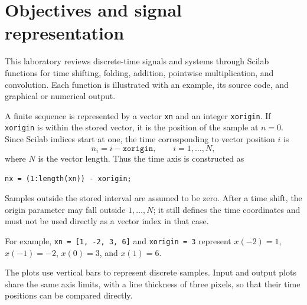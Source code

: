 \section{Objectives and signal representation}
This laboratory reviews discrete-time signals and systems through Scilab
functions for time shifting, folding, addition, pointwise multiplication,
and convolution. Each function is illustrated with an example, its source
code, and graphical or numerical output.

A finite sequence is represented by a vector \texttt{xn} and an integer
\texttt{xorigin}. If \texttt{xorigin} is within the stored vector, it is
the position of the sample at $n=0$. Since Scilab indices start at one,
the time corresponding to vector position $i$ is
\begin{equation}
  n_i=i-\texttt{xorigin},\qquad i=1,\ldots,N,
\end{equation}
where $N$ is the vector length. Thus the time axis is constructed as
\begin{lstlisting}[numbers=none]
nx = (1:length(xn)) - xorigin;
\end{lstlisting}
Samples outside the stored interval are assumed to be zero. After a time
shift, the origin parameter may fall outside $1,\ldots,N$; it still
defines the time coordinates and must not be used directly as a vector
index in that case.

For example, \texttt{xn = [1, -2, 3, 6]} and \texttt{xorigin = 3}
represent $x(-2)=1$, $x(-1)=-2$, $x(0)=3$, and $x(1)=6$.

The plots use vertical bars to represent discrete samples. Input and
output plots share the same axis limits, with a line thickness of three
pixels, so that their time positions can be compared directly.
